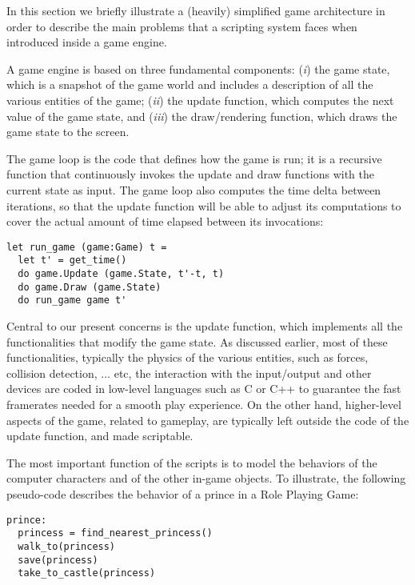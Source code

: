 
In this section we briefly illustrate a (heavily) simplified game architecture in order to describe the main problems that a scripting system faces when introduced inside a game engine.

A game engine is based on three fundamental components: 
({\em i}) the game state, which is a snapshot of the game world
and includes a description of all the various entities of the game; 
({\em ii}) the update  function, which computes the next value of the
game state, and ({\em iii}) the draw/rendering function, which draws
the game state to the screen.

The game loop is the code that defines how the game is run; it is a
recursive function that continuously invokes the update and draw
functions with the current state as input. The game loop also computes
the time delta between iterations, so that the update function will be
able to adjust its computations to cover the actual amount of time
elapsed between its invocations: 

\begin{lstlisting}
let run_game (game:Game) t =
  let t' = get_time()
  do game.Update (game.State, t'-t, t)
  do game.Draw (game.State)
  do run_game game t'
\end{lstlisting}

Central to our present concerns is the update function, which
implements all the functionalities that modify the game state. As 
discussed earlier, most of these functionalities, typically the
physics of the various entities, such as forces, 
collision detection, $\dots$ etc, the interaction with the
input/output and other devices are coded in low-level languages such
as C or C++ to guarantee the fast framerates  needed for a smooth play
experience. On the other hand, higher-level aspects of the game,
related to gameplay, are typically left outside the code of the 
update function, and made scriptable.  

The most important function of the scripts is to model the behaviors
of the computer characters and of the other in-game objects. To
illustrate, the following pseudo-code describes the behavior of  
a prince in a Role Playing Game: 

\begin{lstlisting}
prince:
  princess = find_nearest_princess()
  walk_to(princess)
  save(princess)
  take_to_castle(princess)
\end{lstlisting}

